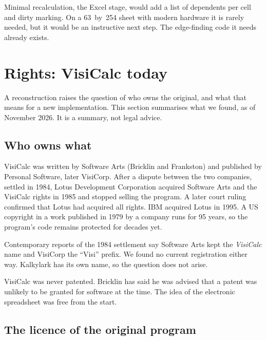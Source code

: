 \documentclass[11pt]{article}
\begin{document}
Minimal recalculation, the Excel stage, would add a list of dependents per
cell and dirty marking. On a 63~by~254 sheet with modern hardware it is
rarely needed, but it would be an instructive next step. The edge-finding
code it needs already exists.

\section{Rights: VisiCalc today}

A reconstruction raises the question of who owns the original, and what
that means for a new implementation. This section summarises what we found,
as of November 2026. It is a summary, not legal advice.

\subsection{Who owns what}

\begin{description}[style=nextline, leftmargin=1.5em]
\item[The code.] VisiCalc was written by Software Arts (Bricklin and
  Frankston) and published by Personal Software, later VisiCorp. After a
  dispute between the two companies, settled in 1984, Lotus Development
  Corporation acquired Software Arts and the VisiCalc rights in 1985 and
  stopped selling the program. A later court ruling confirmed that Lotus
  had acquired all rights. IBM acquired Lotus in 1995. A US copyright in a
  work published in 1979 by a company runs for 95 years, so the program's
  code remains protected for decades yet.
\item[The name.] Contemporary reports of the 1984 settlement say Software
  Arts kept the \emph{VisiCalc} name and VisiCorp the ``Visi'' prefix. We
  found no current registration either way. Kalkylark has its own name, so
  the question does not arise.
\item[The idea.] VisiCalc was never patented. Bricklin has said he was
  advised that a patent was unlikely to be granted for software at the time.
  The idea of the electronic spreadsheet was free from the start.
\end{description}

\subsection{The licence of the original program}
\end{document}
